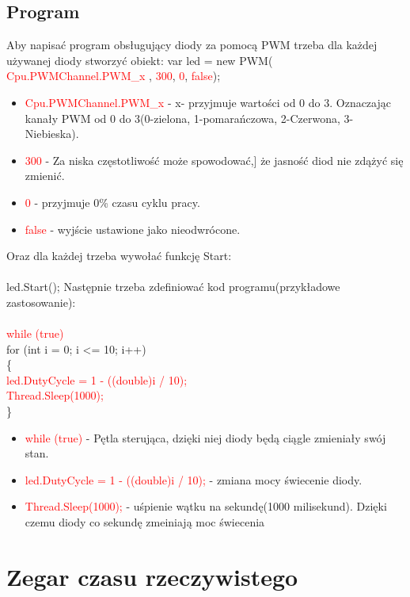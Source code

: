 \documentclass{article}
\begin{document}
\subsection{Program}
Aby napisać program obsługujący diody za pomocą PWM trzeba dla każdej używanej diody stworzyć obiekt:\newline \newline
 var led = new PWM(\space \textcolor{red}{ Cpu.PWMChannel.PWM\_x },\space \textcolor{red}{ 300},\space \textcolor{red}{ 0}, \space \textcolor{red}{ false});
\begin{itemize}
\item \textcolor{red}{Cpu.PWMChannel.PWM\_x} - x- przyjmuje wartości od 0 do 3. Oznaczając kanały PWM od 0 do 3(0-zielona, 1-pomarańczowa, 2-Czerwona, 3-Niebieska).
\item \textcolor{red}{300} - Za niska częstotliwość może spowodować,] że jasność diod nie zdążyć się zmienić.
\item \textcolor{red}{0} - przyjmuje 0\% czasu cyklu pracy.
\item \textcolor{red}{false} - wyjście ustawione jako nieodwrócone.
\end{itemize}
Oraz dla każdej trzeba wywołać funkcję Start:\\\\
led.Start();
Następnie trzeba zdefiniować kod programu(przykładowe zastosowanie):\\\\
\textcolor{red}{while (true)}\\
for (int i = 0; i <= 10; i++)\\
\{\\
\textcolor{red}{led.DutyCycle = 1 - ((double)i / 10);}\\ 
\textcolor{red}{Thread.Sleep(1000);}\\ 
\}
\begin{itemize}
\item \textcolor{red}{while (true)} - Pętla sterująca, dzięki niej diody będą ciągle zmieniały swój stan.
\item \textcolor{red}{led.DutyCycle = 1 - ((double)i / 10);} - zmiana mocy świecenie diody.
\item \textcolor{red}{Thread.Sleep(1000);} - uśpienie wątku na sekundę(1000 milisekund). Dzięki czemu diody co sekundę zmeiniają moc świecenia
\end{itemize}

\section{Zegar czasu rzeczywistego}
\end{document}
